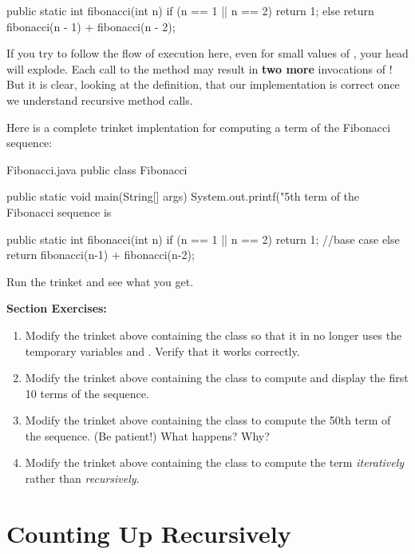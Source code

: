 \begin{code}
public static int fibonacci(int n) {
    if (n == 1 || n == 2) {
        return 1;
    } else {
       return fibonacci(n - 1) + fibonacci(n - 2);
    }
}
\end{code}

If you try to follow the flow of execution here, even for small values of , your head will explode.  Each call to the method  may result in \textbf{two more} invocations of !
But it is clear, looking at the definition, that our implementation is correct once we understand recursive method calls.

Here is a complete trinket implentation for computing a term of the Fibonacci sequence:

\begin{trinket} [270] {Fibonacci.java}
public class Fibonacci {

    public static void main(String[] args) {
       System.out.printf("5th term of the Fibonacci sequence is %
    }
    
    public static int fibonacci(int n) {
       if (n == 1 || n == 2) {
          return 1; //base case
       } else {
          return fibonacci(n-1) + fibonacci(n-2);
       }
    }
}
\end{trinket}

Run the trinket and see what you get.

\textbf{Section Exercises:}
\begin{enumerate}
\item Modify the trinket above containing the class  so that it in no longer uses the temporary variables  and .  Verify that it works correctly.
\item Modify the trinket above containing the class  to compute and display the first 10 terms of the sequence.
\item Modify the trinket above containing the class  to compute the 50th term of the sequence.  (Be patient!)  What happens?  Why?
\item Modify the trinket above containing the class  to compute the term \textit{iteratively} rather than \textit{recursively}.
\end{enumerate}



\section{Counting Up Recursively}
\label{countup}

